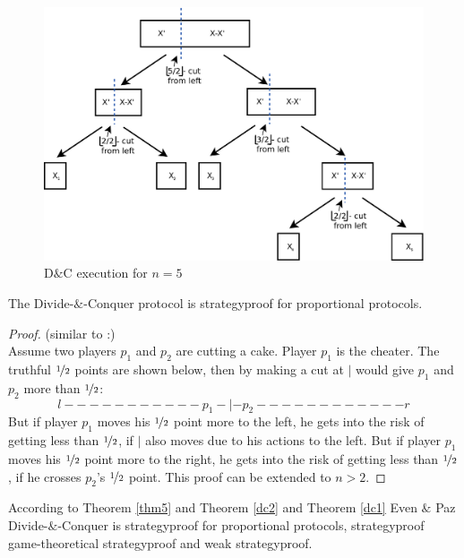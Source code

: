 \begin{figure}[h!]
		\centering
 		 \includegraphics[width=380pt]{bilder/dcbsp.pdf}
   \caption{D$\&$C execution for $n=5$}
  	 \end{figure}
\begin{lem}
\label{dc1}
The Divide-$\&$-Conquer protocol is strategyproof for proportional protocols.
\end{lem}
\begin{proof} (similar to \cite{dc}:)\\
\newline
Assume two players $p_1$ and $p_2$ are cutting a cake. Player $p_1$ is the cheater. The truthful $\nicefrac{1}{2}$ points are shown below, then by making a cut at $|$ would give $p_1$ and $p_2$ more than $\nicefrac{1}{2}$: 
$$l-----------p_1-|-p_2------------r$$ 
But if player $p_1$ moves his $\nicefrac{1}{2}$ point more to the left, he gets into the risk of
getting less than $\nicefrac{1}{2}$, if $|$ also moves due to his actions to the left. 
But if player $p_1$ moves his $\nicefrac{1}{2}$ point more to the right, he gets into the risk of
getting less than $\nicefrac{1}{2}$, if he crosses $p_2$'s $\nicefrac{1}{2}$ point. This proof can be extended to $n>2$.
\end{proof}
\begin{bezeichnungen}
According to Theorem \ref{thm5} and Theorem \ref{dc2} and Theorem \ref{dc1} 
Even $\&$ Paz Divide-$\&$-Conquer is strategyproof for proportional protocols, strategyproof game-theoretical strategyproof and weak strategyproof.
\end{bezeichnungen}
\newpage
 	 
